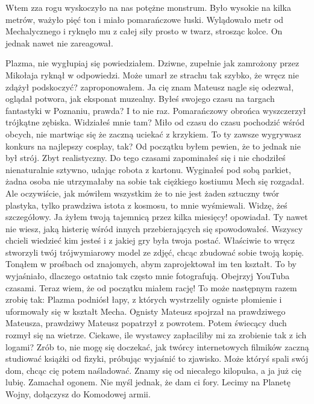 Wtem zza rogu wyskoczyło na nas potężne monstrum.
Było wysokie na kilka metrów, ważyło pięć ton i miało pomarańczowe łuski.
Wylądowało metr od Mechalycznego i ryknęło mu z całej siły prosto w twarz, strosząc kolce.
On jednak nawet nie zareagował.
\begin{dialogue}
\ds{} Plazma, nie wygłupiaj się \dm{} powiedziałem.
\ds{} Dziwne, zupełnie jak zamrożony przez Mikołaja \dm{} ryknął w odpowiedzi.
\ds{} Może umarł ze strachu tak szybko, że wręcz nie zdążył podskoczyć? \dm{} zaproponowałem.
\ds{} Ja cię znam \dm{} Mateusz nagle się odezwał, oglądał potwora, jak eksponat muzealny. \dm{} Byłeś swojego czasu na targach fantastyki w Poznaniu, prawda?
\ds{} I to nie raz. \dm{} Pomarańczowy obrońca wyszczerzył trójkątne zębiska. \dm{} Widziałeś mnie tam? Miło od czasu do czasu pochodzić wśród obcych, nie martwiąc się że zaczną uciekać z krzykiem.
\ds{} To ty zawsze wygrywasz konkurs na najlepszy cosplay, tak? Od początku byłem pewien, że to jednak nie był strój. Zbyt realistyczny.
Do tego czasami zapominałeś się i nie chodziłeś nienaturalnie sztywno, udając robota z kartonu. 
Wyginałeś pod sobą parkiet, żadna osoba nie utrzymałaby na sobie tak ciężkiego kostiumu \dm{} Mech się rozgadał. \dm{} 
Ale oczywiście, jak mówiłem wszystkim że to nie jest żaden sztuczny twór plastyka, tylko prawdziwa istota z kosmosu, to mnie wyśmiewali. 
\ds{} Widzę, żeś szczegółowy.
\ds{} Ja żyłem twoją tajemnicą przez kilka miesięcy! \dm{} opowiadał. \dm{} Ty nawet nie wiesz, jaką histerię wśród innych przebierających się spowodowałeś. 
Wszyscy chcieli wiedzieć kim jesteś i z jakiej gry była twoja postać. 
Właściwie to wręcz stworzyli twój trójwymiarowy model ze zdjęć, chcąc zbudować sobie twoją kopię. Tonąłem w prośbach od znajomych, abym zaprojektował im ten kształt.
\ds{} To by wyjaśniało, dlaczego ostatnio tak często mnie fotografują.
\ds{} Obejrzyj YouTuba czasami. Teraz wiem, że od początku miałem rację!
\ds{} To może następnym razem zrobię tak: \dm{} Plazma podniósł łapy, z których wystrzeliły ogniste płomienie i uformowały się w kształt Mecha. 
Ognisty Mateusz spojrzał na prawdziwego Mateusza, prawdziwy Mateusz popatrzył z powrotem. Potem świecący duch rozmył się na wietrze. \dm{} 
Ciekawe, ile wystawcy zapłaciliby mi za zrobienie tak z ich logami?
\ds{} Zrób to, nie mogę się doczekać, jak twórcy internetowych filmików zaczną studiować książki od fizyki, próbując wyjaśnić to zjawisko. Może któryś spali swój dom, chcąc cię potem naśladować.
\ds{} Znamy się od niecałego kilopulsa, a ja już cię lubię. \dm{} Zamachał ogonem. \dm{} Nie myśl jednak, że dam ci fory. Lecimy na Planetę Wojny, dołączysz do Komodowej armii.

\end{dialogue}
